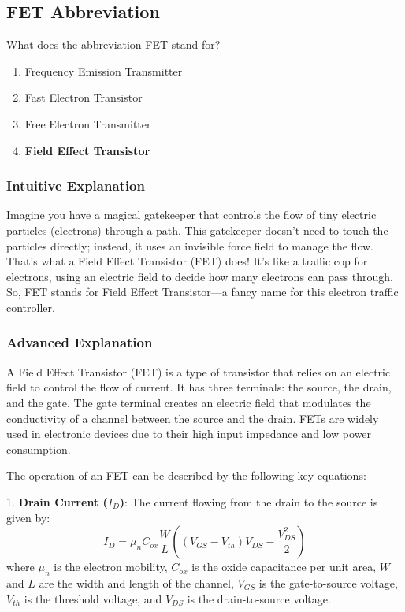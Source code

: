 \subsection{FET Abbreviation}
\label{T6B08}

\begin{tcolorbox}[colback=gray!10!white,colframe=black!75!black,title=T6B08]
What does the abbreviation FET stand for?
\begin{enumerate}[label=\Alph*)]
    \item Frequency Emission Transmitter
    \item Fast Electron Transistor
    \item Free Electron Transmitter
    \item \textbf{Field Effect Transistor}
\end{enumerate}
\end{tcolorbox}

\subsubsection{Intuitive Explanation}
Imagine you have a magical gatekeeper that controls the flow of tiny electric particles (electrons) through a path. This gatekeeper doesn’t need to touch the particles directly; instead, it uses an invisible force field to manage the flow. That’s what a Field Effect Transistor (FET) does! It’s like a traffic cop for electrons, using an electric field to decide how many electrons can pass through. So, FET stands for Field Effect Transistor—a fancy name for this electron traffic controller.

\subsubsection{Advanced Explanation}
A Field Effect Transistor (FET) is a type of transistor that relies on an electric field to control the flow of current. It has three terminals: the source, the drain, and the gate. The gate terminal creates an electric field that modulates the conductivity of a channel between the source and the drain. FETs are widely used in electronic devices due to their high input impedance and low power consumption. 

The operation of an FET can be described by the following key equations:

1. \textbf{Drain Current (\(I_D\))}: The current flowing from the drain to the source is given by:
   \[
   I_D = \mu_n C_{ox} \frac{W}{L} \left( (V_{GS} - V_{th})V_{DS} - \frac{V_{DS}^2}{2} \right)
   \]
   where \(\mu_n\) is the electron mobility, \(C_{ox}\) is the oxide capacitance per unit area, \(W\) and \(L\) are the width and length of the channel, \(V_{GS}\) is the gate-to-source voltage, \(V_{th}\) is the threshold voltage, and \(V_{DS}\) is the drain-to-source voltage.


